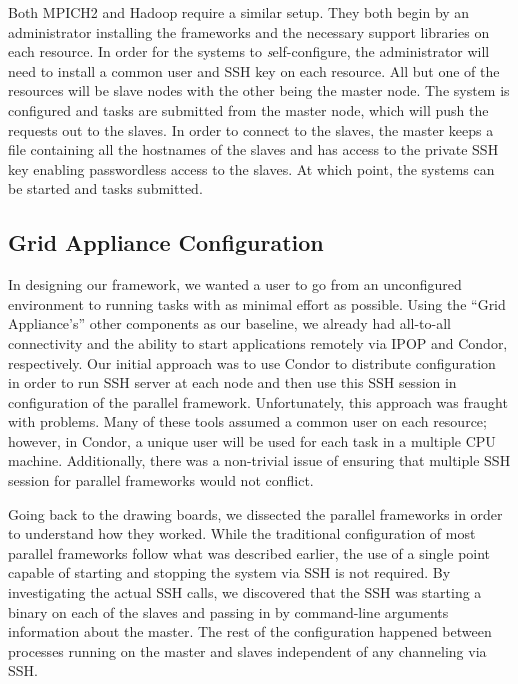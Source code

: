 \documentclass[twocolumn]{svjour3}
\begin{document}
Both MPICH2 and Hadoop require a similar setup.  They both begin by an
administrator installing the frameworks and the necessary support libraries on
each resource.  In order for the systems to {\emph self-configure}, the
administrator will need to install a common user and SSH key on each resource.
All but one of the resources will be slave nodes with the other being the
master node.  The system is configured and tasks are submitted from the master
node, which will push the requests out to the slaves.  In order to connect to
the slaves, the master keeps a file containing all the hostnames of the slaves
and has access to the private SSH key enabling passwordless access to the
slaves.  At which point, the systems can be started and tasks submitted.

\subsection{Grid Appliance Configuration}

In designing our framework, we wanted a user to go from an unconfigured
environment to running tasks with as minimal effort as possible.  Using the
``Grid Appliance's'' other components as our baseline, we already had
all-to-all connectivity and the ability to start applications remotely via IPOP
and Condor, respectively.  Our initial approach was to use Condor to distribute
configuration in order to run SSH server at each node and then use this SSH
session in configuration of the parallel framework.  Unfortunately, this
approach was fraught with problems.  Many of these tools assumed a common user
on each resource; however, in Condor, a unique user will be used for each task
in a multiple CPU machine.  Additionally, there was a non-trivial issue of
ensuring that multiple SSH session for parallel frameworks would not conflict.

Going back to the drawing boards, we dissected the parallel frameworks in order
to understand how they worked.  While the traditional configuration of most
parallel frameworks follow what was described earlier, the use of a single
point capable of starting and stopping the system via SSH is not required.  By
investigating the actual SSH calls, we discovered that the SSH was starting a
binary on each of the slaves and passing in by command-line arguments
information about the master.  The rest of the configuration happened between
processes running on the master and slaves independent of any channeling via
SSH.
\end{document}
